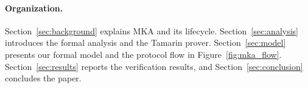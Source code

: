 \paragraph{Organization.} Section~\ref{sec:background} explains MKA and its lifecycle. Section~\ref{sec:analysis} introduces the formal analysis and the Tamarin prover. Section~\ref{sec:model} presents our formal model and the protocol flow in Figure~\ref{fig:mka_flow}. Section~\ref{sec:results} reports the verification results, and Section~\ref{sec:conclusion} concludes the paper.
